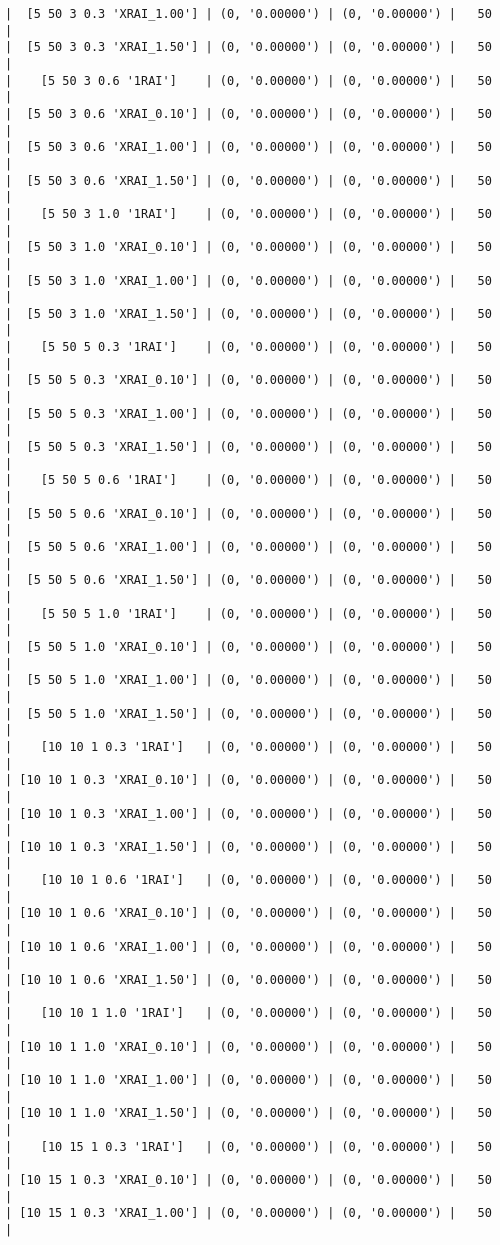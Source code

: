 \documentclass{article}
\begin{document}
\begin{verbatim}
|  [5 50 3 0.3 'XRAI_1.00'] | (0, '0.00000') | (0, '0.00000') |   50  |
|  [5 50 3 0.3 'XRAI_1.50'] | (0, '0.00000') | (0, '0.00000') |   50  |
|    [5 50 3 0.6 '1RAI']    | (0, '0.00000') | (0, '0.00000') |   50  |
|  [5 50 3 0.6 'XRAI_0.10'] | (0, '0.00000') | (0, '0.00000') |   50  |
|  [5 50 3 0.6 'XRAI_1.00'] | (0, '0.00000') | (0, '0.00000') |   50  |
|  [5 50 3 0.6 'XRAI_1.50'] | (0, '0.00000') | (0, '0.00000') |   50  |
|    [5 50 3 1.0 '1RAI']    | (0, '0.00000') | (0, '0.00000') |   50  |
|  [5 50 3 1.0 'XRAI_0.10'] | (0, '0.00000') | (0, '0.00000') |   50  |
|  [5 50 3 1.0 'XRAI_1.00'] | (0, '0.00000') | (0, '0.00000') |   50  |
|  [5 50 3 1.0 'XRAI_1.50'] | (0, '0.00000') | (0, '0.00000') |   50  |
|    [5 50 5 0.3 '1RAI']    | (0, '0.00000') | (0, '0.00000') |   50  |
|  [5 50 5 0.3 'XRAI_0.10'] | (0, '0.00000') | (0, '0.00000') |   50  |
|  [5 50 5 0.3 'XRAI_1.00'] | (0, '0.00000') | (0, '0.00000') |   50  |
|  [5 50 5 0.3 'XRAI_1.50'] | (0, '0.00000') | (0, '0.00000') |   50  |
|    [5 50 5 0.6 '1RAI']    | (0, '0.00000') | (0, '0.00000') |   50  |
|  [5 50 5 0.6 'XRAI_0.10'] | (0, '0.00000') | (0, '0.00000') |   50  |
|  [5 50 5 0.6 'XRAI_1.00'] | (0, '0.00000') | (0, '0.00000') |   50  |
|  [5 50 5 0.6 'XRAI_1.50'] | (0, '0.00000') | (0, '0.00000') |   50  |
|    [5 50 5 1.0 '1RAI']    | (0, '0.00000') | (0, '0.00000') |   50  |
|  [5 50 5 1.0 'XRAI_0.10'] | (0, '0.00000') | (0, '0.00000') |   50  |
|  [5 50 5 1.0 'XRAI_1.00'] | (0, '0.00000') | (0, '0.00000') |   50  |
|  [5 50 5 1.0 'XRAI_1.50'] | (0, '0.00000') | (0, '0.00000') |   50  |
|    [10 10 1 0.3 '1RAI']   | (0, '0.00000') | (0, '0.00000') |   50  |
| [10 10 1 0.3 'XRAI_0.10'] | (0, '0.00000') | (0, '0.00000') |   50  |
| [10 10 1 0.3 'XRAI_1.00'] | (0, '0.00000') | (0, '0.00000') |   50  |
| [10 10 1 0.3 'XRAI_1.50'] | (0, '0.00000') | (0, '0.00000') |   50  |
|    [10 10 1 0.6 '1RAI']   | (0, '0.00000') | (0, '0.00000') |   50  |
| [10 10 1 0.6 'XRAI_0.10'] | (0, '0.00000') | (0, '0.00000') |   50  |
| [10 10 1 0.6 'XRAI_1.00'] | (0, '0.00000') | (0, '0.00000') |   50  |
| [10 10 1 0.6 'XRAI_1.50'] | (0, '0.00000') | (0, '0.00000') |   50  |
|    [10 10 1 1.0 '1RAI']   | (0, '0.00000') | (0, '0.00000') |   50  |
| [10 10 1 1.0 'XRAI_0.10'] | (0, '0.00000') | (0, '0.00000') |   50  |
| [10 10 1 1.0 'XRAI_1.00'] | (0, '0.00000') | (0, '0.00000') |   50  |
| [10 10 1 1.0 'XRAI_1.50'] | (0, '0.00000') | (0, '0.00000') |   50  |
|    [10 15 1 0.3 '1RAI']   | (0, '0.00000') | (0, '0.00000') |   50  |
| [10 15 1 0.3 'XRAI_0.10'] | (0, '0.00000') | (0, '0.00000') |   50  |
| [10 15 1 0.3 'XRAI_1.00'] | (0, '0.00000') | (0, '0.00000') |   50  |

\end{verbatim}
\end{document}
